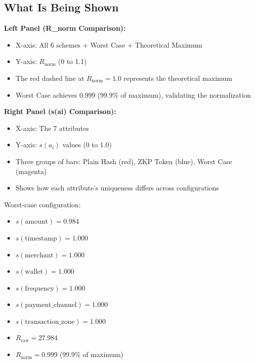 \documentclass[12pt,a4paper,oneside,openany]{report}
\begin{document}
\begin{enumerate}
\subsection{What Is Being Shown}

\textbf{Left Panel (R\_norm Comparison):}
\begin{itemize}
    \item X-axis: All 6 schemes + Worst Case + Theoretical Maximum
    \item Y-axis: $R_{\mathrm{norm}}$ (0 to 1.1)
    \item The red dashed line at $R_{\mathrm{norm}}=1.0$ represents the theoretical maximum
    \item Worst Case achieves 0.999 (99.9\% of maximum), validating the normalization
\end{itemize}

\textbf{Right Panel (s(ai) Comparison):}
\begin{itemize}
    \item X-axis: The 7 attributes
    \item Y-axis: $s(a_i)$ values (0 to 1.0)
    \item Three groups of bars: Plain Hash (red), ZKP Token (blue), Worst Case (magenta)
    \item Shows how each attribute's uniqueness differs across configurations
\end{itemize}

Worst-case configuration:
\begin{itemize}
    \item $s(\text{amount}) = 0.984$
    \item $s(\text{timestamp}) = 1.000$
    \item $s(\text{merchant}) = 1.000$
    \item $s(\text{wallet}) = 1.000$
    \item $s(\text{frequency}) = 1.000$
    \item $s(\text{payment\_channel}) = 1.000$
    \item $s(\text{transaction\_zone}) = 1.000$
    \item $R_{\mathrm{raw}} = 27.984$
    \item $R_{\mathrm{norm}} = 0.999$ (99.9\% of maximum)
\end{itemize}


\end{enumerate}
\end{document}
